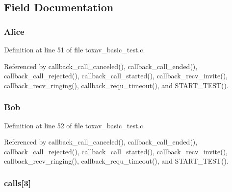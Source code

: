 \subsection{Field Documentation}
\hypertarget{struct___status_a0fd20957e107227630b542b146c276d4}{
\subsubsection[{Alice}]{ Alice}}\label{struct___status_a0fd20957e107227630b542b146c276d4}


Definition at line 51 of file toxav\+\_\+basic\+\_\+test.\+c.



Referenced by callback\+\_\+call\+\_\+canceled(), callback\+\_\+call\+\_\+ended(), callback\+\_\+call\+\_\+rejected(), callback\+\_\+call\+\_\+started(), callback\+\_\+recv\+\_\+invite(), callback\+\_\+recv\+\_\+ringing(), callback\+\_\+requ\+\_\+timeout(), and S\+T\+A\+R\+T\+\_\+\+T\+E\+S\+T().

\hypertarget{struct___status_a78cf423939bd332fd6e5ddae67134e01}{
\subsubsection[{Bob}]{ Bob}}\label{struct___status_a78cf423939bd332fd6e5ddae67134e01}


Definition at line 52 of file toxav\+\_\+basic\+\_\+test.\+c.



Referenced by callback\+\_\+call\+\_\+canceled(), callback\+\_\+call\+\_\+ended(), callback\+\_\+call\+\_\+rejected(), callback\+\_\+call\+\_\+started(), callback\+\_\+recv\+\_\+invite(), callback\+\_\+recv\+\_\+ringing(), callback\+\_\+requ\+\_\+timeout(), and S\+T\+A\+R\+T\+\_\+\+T\+E\+S\+T().

\hypertarget{struct___status_a2f6221bbb611e0d485e26cd2722bd7ee}{
\subsubsection[{calls}]{ calls\mbox{[}3\mbox{]}}}\label{struct___status_a2f6221bbb611e0d485e26cd2722bd7ee}


